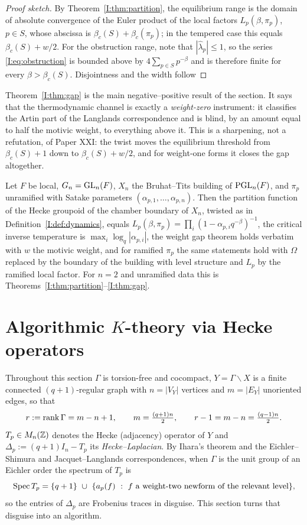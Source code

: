 \begin{proof}[Proof sketch]
By Theorem~\ref{I:thm:partition}, the equilibrium range is the domain of absolute
convergence of the Euler product of the local factors $L_p(\beta,\pi_p)$,
$p\in S$, whose abscissa is $\beta_c(S)+\beta_c(\pi_p)$; in the tempered case this equals
$\beta_c(S)+w/2$. For the obstruction range, note that
$|\widehat\lambda_p|\le1$, so the series \eqref{I:eq:obstruction} is bounded above
by $4\sum_{p\in S}p^{-\beta}$ and is therefore finite for every
$\beta>\beta_c(S)$. Disjointness and the width follow
\end{proof}

Theorem~\ref{I:thm:gap} is the main negative--positive result of the section. It says that
the thermodynamic channel is exactly a \emph{weight-zero} instrument: it classifies the
Artin part of the Langlands correspondence and is blind, by an amount equal to half the
motivic weight, to everything above it. This is a sharpening, not a refutation, of Paper
XXI: the twist moves the equilibrium threshold from $\beta_c(S)+1$ down to
$\beta_c(S)+w/2$, and for weight-one forms it closes the gap altogether.

\begin{conjecture}\label{I:conj:gln}
Let $F$ be local, $G_n=\mathrm{GL}_n(F)$, $X_n$ the Bruhat--Tits building of $\mathrm{PGL}_n(F)$, and
$\pi_p$ unramified with Satake parameters $(\alpha_{p,1},\dots,\alpha_{p,n})$. Then the
partition function of the Hecke groupoid of the chamber boundary of $X_n$, twisted as in
Definition~\ref{I:def:dynamics}, equals $L_p(\beta,\pi_p)=\prod_i(1-\alpha_{p,i}q^{-\beta})^{-1}$,
the critical inverse temperature is $\max_i\log_q|\alpha_{p,i}|$, the weight gap theorem
holds verbatim with $w$ the motivic weight, and for ramified $\pi_p$ the same statements
hold with $\Omega$ replaced by the boundary of the building with level structure and
$L_p$ by the ramified local factor. For $n=2$ and unramified data this is
Theorems~\ref{I:thm:partition}--\ref{I:thm:gap}.
\end{conjecture}

\section{Algorithmic \texorpdfstring{$K$}{K}-theory via Hecke operators}\label{I:sec:ktheory}

Throughout this section $\Gamma$ is torsion-free and cocompact, $Y=\Gamma\backslash X$ is
a finite connected $(q+1)$-regular graph with $n=|V_Y|$ vertices and $m=|E_Y|$ unoriented
edges, so that
\[
r:=\operatorname{rank}\Gamma=m-n+1,\qquad m=\tfrac{(q+1)n}{2},\qquad r-1=m-n=\tfrac{(q-1)n}{2}.
\]
$T_p\in M_n(\mathbb{Z})$ denotes the Hecke (adjacency) operator of $Y$ and
$\Delta_p:=(q+1)I_n-T_p$ its \emph{Hecke--Laplacian}. By Ihara's theorem and the
Eichler--Shimura and Jacquet--Langlands correspondences, when $\Gamma$ is the unit group
of an Eichler order the spectrum of $T_p$ is
\[
\Spec T_p=\{q+1\}\ \cup\ \{a_p(f)\ :\ f\ \text{a weight-two newform of the relevant level}\},
\]
so the entries of $\Delta_p$ are Frobenius traces in disguise. This section turns that
disguise into an algorithm.

